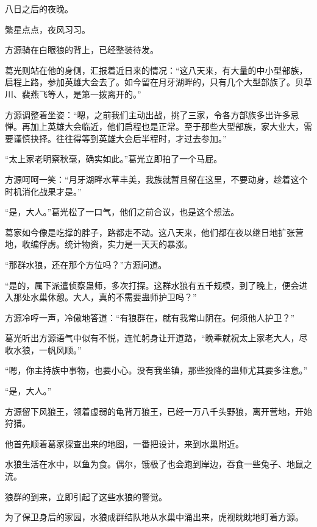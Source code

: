 
\begin{this_body}



八日之后的夜晚。

繁星点点，夜风习习。

方源骑在白眼狼的背上，已经整装待发。

葛光则站在他的身侧，汇报着近日来的情况：“这八天来，有大量的中小型部族，启程上路，参加英雄大会去了。如今留在月牙湖畔的，只有几个大型部族了。贝草川、裴燕飞等人，是第一拨离开的。”

方源调整着坐姿：“嗯，之前我们主动出战，挑了三家，令各方部族多出许多忌惮。再加上英雄大会临近，他们启程也是正常。至于那些大型部族，家大业大，需要谨慎抉择。往往得等到英雄大会后半程时，才过去参加。”

“太上家老明察秋毫，确实如此。”葛光立即拍了一个马屁。

方源呵呵一笑：“月牙湖畔水草丰美，我族就暂且留在这里，不要动身，趁着这个时机消化战果才是。”

“是，大人。”葛光松了一口气，他们之前合议，也是这个想法。

葛家如今像是吃撑的胖子，路都走不动。这八天来，他们都在夜以继日地扩张营地，收编俘虏。统计物资，实力是一天天的暴涨。

“那群水狼，还在那个方位吗？”方源问道。

“是的，属下派遣侦察蛊师，多次打探。这群水狼有五千规模，到了晚上，便会进入那处水巢休憩。大人，真的不需要蛊师护卫吗？”

方源冷哼一声，冷傲地答道：“有狼群在，就有我常山阴在。何须他人护卫？”

葛光听出方源语气中似有不悦，连忙躬身让开道路，“晚辈就祝太上家老大人，尽收水狼，一帆风顺。”

“嗯，你主持族中事物，也要小心。没有我坐镇，那些投降的蛊师尤其要多注意。”

“是，大人。”

方源留下风狼王，领着虚弱的龟背万狼王，已经一万八千头野狼，离开营地，开始狩猎。

他首先顺着葛家探查出来的地图，一番把设计，来到水巢附近。

水狼生活在水中，以鱼为食。偶尔，饿极了也会跑到岸边，吞食一些兔子、地鼠之流。

狼群的到来，立即引起了这些水狼的警觉。

为了保卫身后的家园，水狼成群结队地从水巢中涌出来，虎视眈眈地盯着方源。


\end{this_body}
